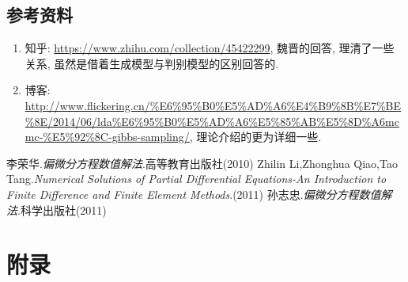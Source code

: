 \documentclass[a4paper,UTF8]{ctexart}
\theoremstyle{plain} \newtheorem{theorem}{定理}[section]
\theoremstyle{plain} \newtheorem{definition}{定义}[section]
\theoremstyle{plain} \newtheorem{lemma}{引理}[section]
\theoremstyle{plain} \newtheorem{proposition}{命题}[section]
\theoremstyle{plain} \newtheorem{example}{例}[section]
\theoremstyle{plain} \newtheorem{remark}{注}[section]
\theoremstyle{plain} \newtheorem{corollary}{推论}[section]
\begin{document}
\subsection{参考资料}
\begin{enumerate}[(1)]
\item 知乎: \url{https://www.zhihu.com/collection/45422299}, 魏晋的回答, 理清了一些关系, 虽然是借着生成模型与判别模型的区别回答的.

\item 博客: \url{http://www.flickering.cn/%E6%95%B0%E5%AD%A6%E4%B9%8B%E7%BE%8E/2014/06/lda%E6%95%B0%E5%AD%A6%E5%85%AB%E5%8D%A6mcmc-%E5%92%8C-gibbs-sampling/}, 理论介绍的更为详细一些.


\end{enumerate}





\begin{thebibliography}{4}
   李荣华.\emph{偏微分方程数值解法}.高等教育出版社(2010) 
   Zhilin Li,Zhonghua Qiao,Tao Tang.\emph{Numerical Solutions of Partial Differential Equations-An Introduction to Finite Difference and Finite Element Methods}.(2011)
   孙志忠.\emph{偏微分方程数值解法}.科学出版社(2011)

\end{thebibliography}

\newpage

\section*{附录}
\end{document}
